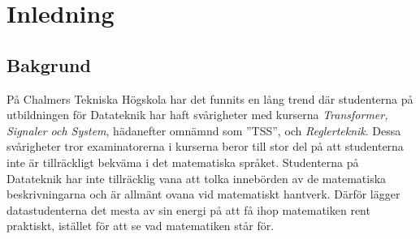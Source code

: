 \documentclass[]{article}
\begin{document}
\newpage
\tableofcontents

\newpage

\printglossary[title=Ordlista,nonumberlist]

\newpage

\setlength{\parskip}{2mm}
\setlength{\parindent}{0pt}




\section{Inledning}

\subsection{Bakgrund}

%

På Chalmers Tekniska Högskola har det funnits en lång trend där
studenterna på utbildningen för Datateknik har haft svårigheter
med kurserna \textit{Transformer, Signaler och System}, hädanefter omnämnd
som ''TSS'', och \textit{Reglerteknik}.
Dessa svårigheter tror examinatorerna i kurserna beror till stor del på att
studenterna inte är tillräckligt bekväma i det matematiska språket.
Studenterna på Datateknik har inte tillräcklig vana att tolka innebörden av de matematiska beskrivningarna och är allmänt ovana vid matematiskt hantverk.
Därför lägger datastudenterna det mesta av sin energi på att få ihop matematiken
rent praktiskt, istället för att se vad matematiken står för.
\end{document}

